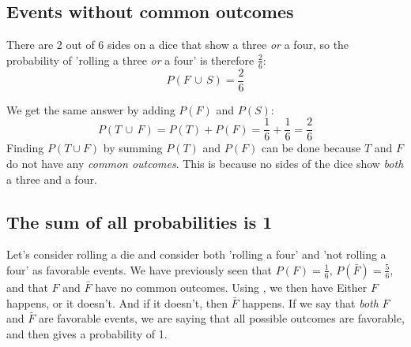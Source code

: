 \subsection{Events without common outcomes} \vspace{-5pt}
 \qquad
{}
There are 2 out of 6 sides on a dice that show a three \textsl{or} a four, so the probability of 'rolling a three \textsl{or} a four' is therefore $ \frac{2}{6} $:
\[ P(F\,\cup\,S)=\frac{2}{6} \]

We get the same answer by adding $P(F)$ and $P(S)$:
\[ P(T\,\cup\,F)=P(T)+P(F)=\frac{1}{6}+\frac{1}{6}=\frac{2}{6} \]
Finding $ P(T\cup F) $ by summing $ P(T) $ and $ P(F) $ can be done because $ T $ and $ F $ do not have any \textit{common outcomes}. This is because no sides of the dice show \textsl{both} a three and a four. \regv

\newpage
{}
\newpage
\subsection{The sum of all probabilities is 1}
Let's consider rolling a die and consider both 'rolling a four' and 'not rolling a four' as favorable events. We have previously seen that $ {P(F)=\frac{1}{6}} $, $ {P(\bar{F})=\frac{5}{6} }$, and that $ F $ and $ \bar{F} $ have no common outcomes. Using , we then have
Either $ F $ happens, or it doesn't. And if it doesn't, then $ \bar{F} $ happens. If we say that \textsl{both} $ F $ and $ \bar{F} $ are favorable events, we are saying that all possible outcomes are favorable, and then  gives a probability of 1. \regv

